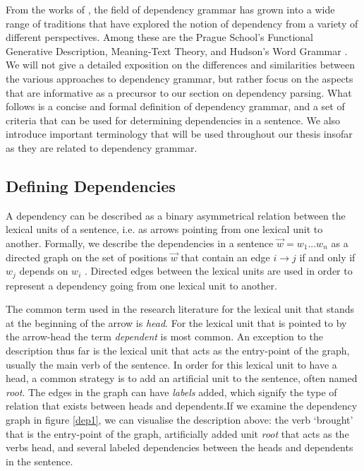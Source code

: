 From the works of \citeauthor{Tes:15}, the field of dependency grammar has grown into a wide range of traditions that have explored the notion of dependency from a variety of different perspectives. Among these are the Prague School's Functional Generative Description, Meaning-Text Theory, and Hudson's Word Grammar \cite{Sgall:86, Mel:88, Hudson:90}. We will not give a detailed exposition on the differences and similarities between the various approaches to dependency grammar, but rather focus on the aspects that are informative as a precursor to our section on dependency parsing. What follows is a concise and formal definition of dependency grammar, and a set of criteria that can be used for determining dependencies in a sentence. We also introduce important terminology that will be used throughout our thesis insofar as they are related to dependency grammar.

\subsection{Defining Dependencies}
\label{definitions}

A dependency can be described as a binary asymmetrical relation between the lexical units of a sentence, i.e. as arrows pointing from one lexical unit to another. Formally, we describe the dependencies in a sentence $\vec{w} = w_1 ... w_n$ as a directed graph on the set of positions $\vec{w}$ that contain an edge $i \rightarrow j$ if and only if $w_j$ depends on $w_i$ \cite{Kuhl:10}. Directed edges between the lexical units are used in order to represent a dependency going from one lexical unit to another.

The common term used in the research literature for the lexical unit that stands at the beginning of the arrow is \textit{head}. For the lexical unit that is pointed to by the arrow-head the term \textit{dependent} is most common. An exception to the description thus far is the lexical unit that acts as the entry-point of the graph, usually the main verb of the sentence. In order for this lexical unit to have a head, a common strategy is to add an artificial unit to the sentence, often named \textit{root}. The edges in the graph can have \textit{labels} added, which signify the type of relation that exists between heads and dependents.If we examine the dependency graph in figure \ref{dep1}, we can visualise the description above: the verb `brought' that is the entry-point of the graph, artificially added unit \textit{root} that acts as the verbs head, and several labeled dependencies between the heads and dependents in the sentence. 

